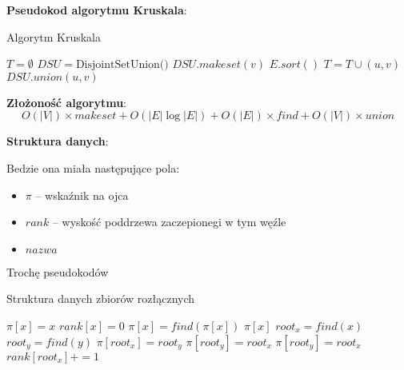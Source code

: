 \documentclass[11pt,a4paper]{article}
\begin{document}
\textbf{Pseudokod algorytmu Kruskala}:
\begin{algorithm}
    \caption{Algorytm Kruskala}
    \begin{algorithmic}[1]
        \State $T = \emptyset$ 
        \State $DSU = \text{DisjointSetUnion()}$ 
         
            \State $DSU.makeset(v)$
        \EndFor
        \State $E.sort()$ 
         
             
                \State $T = T \cup {(u,v)}$
                \State $DSU.union(u,v)$ 
            \EndIf
        \EndFor
        \EndProcedure
    \end{algorithmic}
\end{algorithm}

\textbf{Złożoność algorytmu}:
\[
    O(|V|) \times makeset + O(|E| \log |E|) + O(|E|) \times find + O(|V|) \times union
\]

\textbf{Struktura danych}:

Bedzie ona miała następujące pola:
\begin{itemize}
    \item $\pi$ -- wskaźnik na ojca
    \item $rank$ -- wyskość poddrzewa zaczepionegi w tym węźle
    \item $nazwa$
\end{itemize}

Trochę pseudokodów
\begin{algorithm}
    \caption{Struktura danych zbiorów rozłącznych}
    \begin{algorithmic}[1]
            \State $\pi[x] = x$ 
            \State $rank[x] = 0$ 
        \EndProcedure
             
                \State $\pi[x] = find(\pi[x])$ 
            \EndIf
            \State \Return $\pi[x]$ 
            \State $root_x = find(x)$
            \State $root_y = find(y)$
             
                    \State $\pi[root_x] = root_y$
                    \State $\pi[root_y] = root_x$
                \Else
                    \State $\pi[root_y] = root_x$
                    \State $rank[root_x] += 1$
                \EndIf
            \EndIf
        \EndProcedure
    \end{algorithmic}
\end{algorithm}
\end{document}
